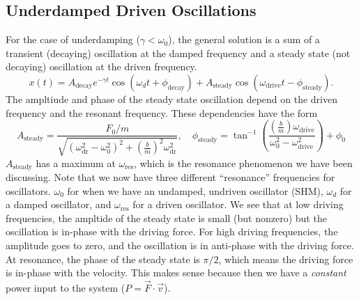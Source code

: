 \documentclass[../classical_mechanics.tex]{subfiles}
\begin{document}
        \subsection{Underdamped Driven Oscillations}\label{subsec:underdamped-driven-oscillations}
            For the case of underdamping ($\gamma<\omega_0$), the general solution is a sum of a transient (decaying) oscillation at the damped frequency and a steady state (not decaying) oscillation at the driven frequency.
            \begin{equation}
                x(t)=A_\text{decay}e^{-\gamma t}\cos(\omega_d t+\phi_\text{decay})+A_\text{steady}\cos(\omega_\text{drive}t-\phi_\text{steady}).
            \end{equation}
            The ampltiude and phase of the steady state oscillation depend on the driven frequency and the resonant frequency.
            These dependencies have the form
            \begin{equation}
                A_\text{steady}=\frac{F_0/m}{\sqrt{(\omega_\text{dr}^2-\omega_0^2)^2+\left(\frac{b}{m}\right)^2\omega_\text{dr}^2}},\quad\phi_\text{steady}=\tan^{-1}\left(\frac{\left(\frac{b}{m}\right)\omega_\text{drive}}{\omega_0^2-\omega_\text{drive}^2}\right)+\phi_0
            \end{equation}
            $A_\text{steady}$ has a maximum at $\omega_\text{res}$, which is the resonance phenomenon we have been discussing.
            Note that we now have three different ``resonance'' frequencies for oscillators.
            $\omega_0$ for when we have an undamped, undriven oscillator (SHM), $\omega_d$ for a damped oscillator, and $\omega_\text{res}$ for a driven oscillator.
            We see that at low driving frequencies, the ampltide of the steady state is small (but nonzero) but the oscillation is in-phase with the driving force.
            For high driving frequencies, the amplitude goes to zero, and the oscillation is in anti-phase with the driving force.
            At resonance, the phase of the steady state is $\pi/2$, which means the driving force is in-phase with the velocity.
            This makes sense because then we have a \textit{constant} power input to the system ($P=\vec{F}\cdot\vec{v}$).
\end{document}
